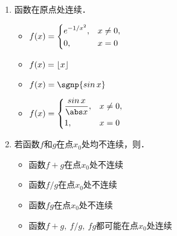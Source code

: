 \documentclass[a4paper,punct=CCT]{ctexbook}
\theoremstyle{definition}
\theoremstyle{remark}
\newif\ifshowsol
\begin{document}
\begin{enumerate}
\item 函数\uline{\makebox[10em]{}}在原点处连续．
  \begin{itemize}
    \renewcommand{\labelitemi}{\faCircleThin}
    \ifshowsol
  \item[\faCircle]
    \else
  \item
    \fi
    \begin{math}
      f(x) =
      \begin{dcases}
        e^{-1/x^2}, & x \ne 0, \\
        0, & x = 0
      \end{dcases}
    \end{math}
  \item \(f(x) = \lfloor x\rfloor\)
  \item \(f(x) = \sgnp{\sin x}\)
  \item
    \begin{math}
      f(x) =
      \begin{dcases}
        \frac{\sin x}{\abs x}, & x \ne 0, \\
        1, & x = 0
      \end{dcases}
    \end{math}\rule{0ex}{5ex}
  \end{itemize}

  \ifshowsol
  原点是选项B、C、D中函数的跳跃间断点．选项A中的函数在原点处的左右极限都是\(0\)且等于此处的函数值，因此连续．
  \fi

\item 若函数\(f\)和\(g\)在点\(x_0\)处均不连续，则\uline{\makebox[10em]{}}．
  \begin{itemize}
    \renewcommand{\labelitemi}{\faCircleThin}
  \item 函数\(f+g\)在点\(x_0\)处不连续
  \item 函数\(f/g\)在点\(x_0\)处不连续
  \item 函数\(fg\)在点\(x_0\)处不连续
    \ifshowsol
  \item[\faCircle]
    \else
  \item
    \fi
    函数\(f+g,\ f/g,\ fg\)都可能在点\(x_0\)处连续
  \end{itemize}

  \ifshowsol
  令\(f(x) = \Fn H(x),\ g(x) = 1-\Fn H(x)\)，则\(f + g = 1,\ fg = 0\)，因此选项A和C不正确．令
  \begin{equation*}
    f(x) = g(x) = \frac{1}{x \Fn H(x) + \Fn H(-x)},
  \end{equation*}
  则\(f/g = 1\)，因此选项B不正确．
  \fi
\end{enumerate}
\fi
\end{document}
